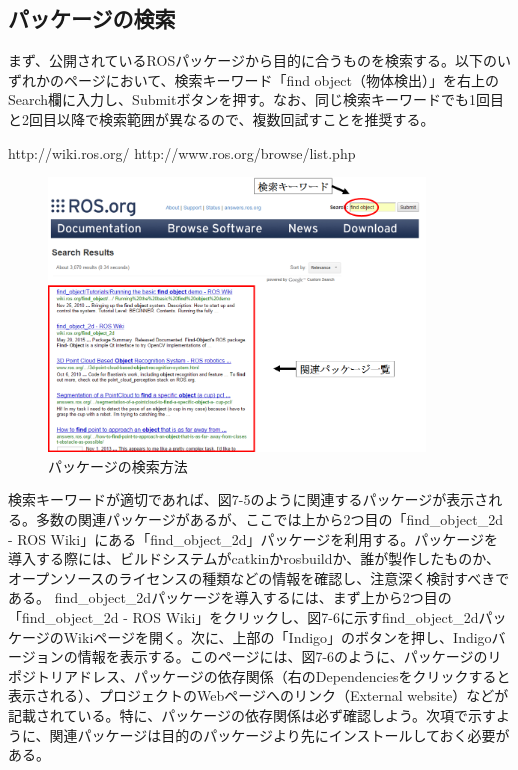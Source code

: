 \subsection{パッケージの検索}

まず、公開されているROSパッケージから目的に合うものを検索する。以下のいずれかのページにおいて、検索キーワード「find object（物体検出）」を右上のSearch欄に入力し、Submitボタンを押す。なお、同じ検索キーワードでも1回目と2回目以降で検索範囲が異なるので、複数回試すことを推奨する。

http://wiki.ros.org/
http://www.ros.org/browse/list.php

\begin{figure}[htp]
  \centering
  \includegraphics[width=10cm]{pictures/chapter7/pic_07_05.png}
  \caption{パッケージの検索方法}
\end{figure}

検索キーワードが適切であれば、図7-5のように関連するパッケージが表示される。多数の関連パッケージがあるが、ここでは上から2つ目の「find\_object\_2d - ROS Wiki」にある「find\_object\_2d」パッケージを利用する。パッケージを導入する際には、ビルドシステムがcatkinかrosbuildか、誰が製作したものか、オープンソースのライセンスの種類などの情報を確認し、注意深く検討すべきである。
find\_object\_2dパッケージを導入するには、まず上から2つ目の「find\_object\_2d - ROS Wiki」をクリックし、図7-6に示すfind\_object\_2dパッケージのWikiページを開く。次に、上部の「Indigo」のボタンを押し、Indigoバージョンの情報を表示する。このページには、図7-6のように、パッケージのリポジトリアドレス、パッケージの依存関係（右のDependenciesをクリックすると表示される）、プロジェクトのWebページへのリンク（External website）などが記載されている。特に、パッケージの依存関係は必ず確認しよう。次項で示すように、関連パッケージは目的のパッケージより先にインストールしておく必要がある。

